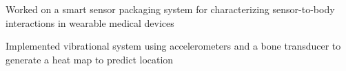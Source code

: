 \documentclass[]{deedy-resume-openfont}
\begin{document}
\begin{minipage}[t]{0.66\textwidth}
\sectionsep

\begin{tightemize}
\item Worked on a smart sensor packaging system for characterizing sensor-to-body interactions in wearable medical devices
\item Implemented vibrational system using accelerometers and a bone transducer
to generate a heat map to predict location
\end{tightemize}
\sectionsep






\end{minipage}
\end{document}
